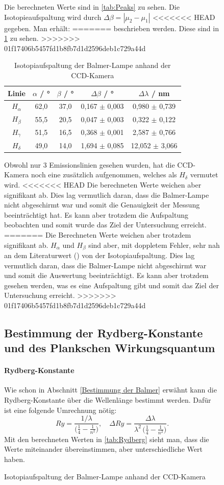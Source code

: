 \begin{figure}
Die berechneten Werte sind in \cref{tab:Peaks} zu sehen.
Die Isotopieaufspaltung wird durch 
$\Delta\beta = |\mu_2 - \mu_1|$
<<<<<<< HEAD
gegeben. 
Man erhält:
=======
beschrieben werden. 
Diese sind in \cref{tab:Isotopiaufspaltung} zu sehen.
>>>>>>> 01f17406b5457fd1b8fb7d1d2596deb1c729a44d
\begin{table}[htbp]
    \centering
    \begin{tabular}{|c|c|c|c|c|}
        Linie & $\alpha$ / ° & $\beta$ / ° & $\Delta\beta$ / ° & $\Delta\lambda$ / nm \\
        \hline
        $H_\alpha$& 62,0 & 37,0 & 0,167 $\pm$ 0,003 & 0,980 $\pm$ 0,739 \\
        $H_\beta$ & 55,5 & 20,5 & 0,047 $\pm$ 0,003 & 0,322 $\pm$ 0,122 \\
        $H_\gamma$ & 51,5 & 16,5 & 0,368 $\pm$ 0,001 & 2,587 $\pm$ 0,766 \\
        $H_\delta$ & 49,0 & 14,0 & 1,694 $\pm$ 0,085 & 12,052 $\pm$ 3,066 \\
    \end{tabular}
    \caption{Isotopiaufspaltung der Balmer-Lampe anhand der CCD-Kamera}
    \label{tab:Isotopiaufspaltung}
\end{table}
Obwohl nur 3 Emissionslinien gesehen wurden, hat die CCD- Kamera noch eine zusätzlich aufgenommen, welches als $H_\delta$ vermutet wird.
<<<<<<< HEAD
Die berechneten Werte weichen aber signifikant ab.
Dies lag vermutlich daran, dass die Balmer-Lampe nicht abgeschirmt war und somit die Genauigkeit der Messung beeinträchtigt hat. 
Es kann aber trotzdem die Aufspaltung beobachten und somit wurde das Ziel der Untersuchung erreicht.
=======
Die Berechneten Werte weichen aber trotzdem signifikant ab.
$H_\alpha$ und $H_\beta$ sind aber, mit doppletem Fehler, sehr nah an dem Literaturwert (\cite{Ulm}) von der Isotopiaufspaltung.
Dies lag vermutlich daran, dass die Balmer-Lampe nicht abgeschirmt war und somit die Auswertung beeinträchtigt. 
Es kann aber trotzdem gesehen werden, was es eine Aufspaltung gibt und somit das Ziel der Untersuchung erreicht.
>>>>>>> 01f17406b5457fd1b8fb7d1d2596deb1c729a44d

\subsection{Bestimmung der Rydberg-Konstante und des Plankschen Wirkungsquantum}
\paragraph{Rydberg-Konstante} \label{Rydberg-konst}
Wie schon in Abschnitt \ref{Bestimmung der Balmer} erwähnt kann die Rydberg-Konstante über die Wellenlänge bestimmt werden.
Dafür ist eine folgende Umrechnung nötig:
\begin{equation}
  Ry
  = \frac{1/\lambda}{\bigl(\tfrac{1}{4} - \tfrac{1}{n^{2}}\bigr)},
  \quad
  \Delta Ry
  = \frac{\Delta\lambda}{\lambda^{2}\,\bigl(\tfrac{1}{4} - \tfrac{1}{n^{2}}\bigr)}.
\end{equation}
Mit den berechneten Werten in \cref{tab:Rydberg} sieht man, dass die Werte miteinander übereinstimmen, aber unterschiedliche Wert haben. 


\end{figure}
